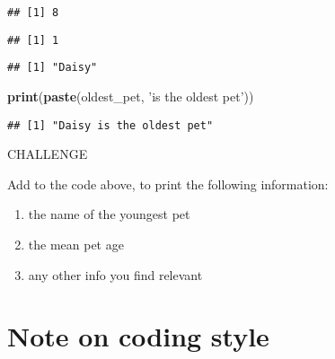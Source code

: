 \documentclass[]{book}
\newenvironment{Shaded}{\begin{snugshade}}{\end{snugshade}}
\newcommand{\CommentTok}[1]{\textcolor[rgb]{0.56,0.35,0.01}{\textit{#1}}}
\newcommand{\KeywordTok}[1]{\textcolor[rgb]{0.13,0.29,0.53}{\textbf{#1}}}
\newcommand{\NormalTok}[1]{#1}
\newcommand{\OperatorTok}[1]{\textcolor[rgb]{0.81,0.36,0.00}{\textbf{#1}}}
\newcommand{\StringTok}[1]{\textcolor[rgb]{0.31,0.60,0.02}{#1}}
\begin{document}
\begin{verbatim}
## [1] 8
\end{verbatim}

\begin{Shaded}
\end{Shaded}

\begin{verbatim}
## [1] 1
\end{verbatim}

\begin{Shaded}
\end{Shaded}

\begin{verbatim}
## [1] "Daisy"
\end{verbatim}

\begin{Shaded}
\begin{Highlighting}[]
\KeywordTok{print}\NormalTok{(}\KeywordTok{paste}\NormalTok{(oldest_pet, }\StringTok{'is the oldest pet'}\NormalTok{))}
\end{Highlighting}
\end{Shaded}

\begin{verbatim}
## [1] "Daisy is the oldest pet"
\end{verbatim}

\leavevmode\hypertarget{challenge}{}%
CHALLENGE

Add to the code above, to print the following information:

\begin{enumerate}
\def\labelenumi{\arabic{enumi}.}
\item
  the name of the youngest pet
\item
  the mean pet age
\item
  any other info you find relevant
\end{enumerate}

\hypertarget{note-on-coding-style}{%
\section{Note on coding style}\label{note-on-coding-style}}
\end{document}

